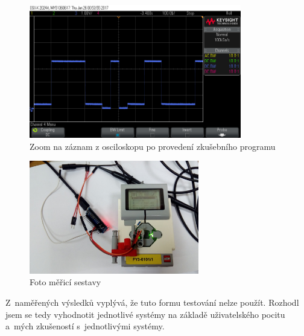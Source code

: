 \begin{figure}[h]
	\centering
	\includegraphics[width=350px]{images/measuring-oscilloscope_ev3-software_led-blinking_part1.png}
	\caption[Zoom na záznam z osciloskopu po provedení zkušebního programu]{Zoom na záznam z osciloskopu po provedení zkušebního programu}
	\label{fig:measuring_lego-ev3_orig-soft_led-blinking_part1}
\end{figure}

\begin{figure}[h]
	\centering
	\includegraphics[width=280px]{images/measuring-system_photo.jpg}
	\caption[Foto měřicí sestavy]{Foto měřicí sestavy}
	\label{fig:measuring-system_photo}
\end{figure}

Z~naměřených výsledků vyplývá, že tuto formu testování nelze použít.
Rozhodl jsem se tedy vyhodnotit jednotlivé systémy na základě uživatelského pocitu a~mých zkušeností s~jednotlivými systémy.

